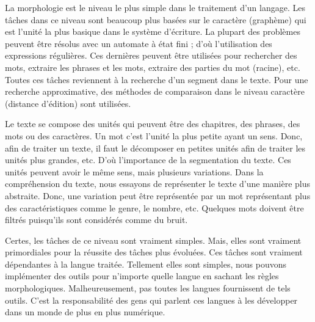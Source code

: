 \documentclass{KodeBook}
\begin{document}
\begin{discussion}
	La morphologie est le niveau le plus simple dans le traitement d'un langage. 
	Les tâches dans ce niveau sont beaucoup plus basées sur le caractère (graphème) qui est l'unité la plus basique dans le système d'écriture.  
	La plupart des problèmes peuvent être résolus avec un automate à état fini ; d'où l'utilisation des expressions régulières. 
	Ces dernières peuvent être utilisées pour rechercher des mots, extraire les phrases et les mots, extraire des parties du mot (racine), etc. 
	Toutes ces tâches reviennent à la recherche d'un segment dans le texte. 
	Pour une recherche approximative, des méthodes de comparaison dans le niveau caractère (distance d'édition) sont utilisées. 
	
	Le texte se compose des unités qui peuvent être des chapitres, des phrases, des mots ou des caractères.
	Un mot c'est l'unité la plus petite ayant un sens. 
	Donc, afin de traiter un texte, il faut le décomposer en petites unités  afin de traiter les unités plus grandes, etc. 
	D'où l'importance de la segmentation du texte. 
	Ces unités peuvent avoir le même sens, mais plusieurs variations. 
	Dans la compréhension du texte, nous essayons de représenter le texte d'une manière plus abstraite.
	Donc, une variation peut être représentée par un mot représentant plus des caractéristiques comme le genre, le nombre, etc. 
	Quelques mots doivent être filtrés puisqu'ils sont considérés comme du bruit.
	
	Certes, les tâches de ce niveau sont vraiment simples. 
	Mais, elles sont vraiment primordiales pour la réussite des tâches plus évoluées. 
	Ces tâches sont vraiment dépendantes à la langue traitée.
	Tellement elles sont simples, nous pouvons implémenter des outils pour n'importe quelle langue en sachant les règles morphologiques. 
	Malheureusement, pas toutes les langues fournissent de tels outils.  
	C'est la responsabilité des gens qui parlent ces langues à les développer dans un monde de plus en plus numérique.
	
\end{discussion}

\ifx\wholebook\relax\else
% 
% 
	
\end{document}
